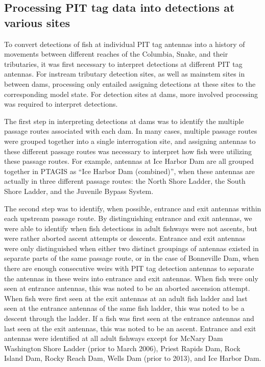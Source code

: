 \documentclass[
  12pt,
]{report}
\begin{document}
\hypertarget{processing-pit-tag-data-into-detections-at-various-sites}{%
\subsection{Processing PIT tag data into detections at various
sites}\label{processing-pit-tag-data-into-detections-at-various-sites}}

To convert detections of fish at individual PIT tag antennas into a
history of movements between different reaches of the Columbia, Snake,
and their tributaries, it was first necessary to interpret detections at
different PIT tag antennas. For instream tributary detection sites, as
well as mainstem sites in between dams, processing only entailed
assigning detections at these sites to the corresponding model state.
For detection sites at dams, more involved processing was required to
interpret detections.

The first step in interpreting detections at dams was to identify the
multiple passage routes associated with each dam. In many cases,
multiple passage routes were grouped together into a single
interrogation site, and assigning antennas to these different passage
routes was necessary to interpret how fish were utilizing these passage
routes. For example, antennas at Ice Harbor Dam are all grouped together
in PTAGIS as ``Ice Harbor Dam (combined)'', when these antennas are
actually in three different passage routes: the North Shore Ladder, the
South Shore Ladder, and the Juvenile Bypass System.

The second step was to identify, when possible, entrance and exit
antennas within each upstream passage route. By distinguishing entrance
and exit antennas, we were able to identify when fish detections in
adult fishways were not ascents, but were rather aborted ascent attempts
or descents. Entrance and exit antennas were only distinguished when
either two distinct groupings of antennas existed in separate parts of
the same passage route, or in the case of Bonneville Dam, when there are
enough consecutive weirs with PIT tag detection antennas to separate the
antennas in these weirs into entrance and exit antennas. When fish were
only seen at entrance antennas, this was noted to be an aborted
ascension attempt. When fish were first seen at the exit antennas at an
adult fish ladder and last seen at the entrance antennas of the same
fish ladder, this was noted to be a descent through the ladder. If a
fish was first seen at the entrance antennas and last seen at the exit
antennas, this was noted to be an ascent. Entrance and exit antennas
were identified at all adult fishways except for McNary Dam Washington
Shore Ladder (prior to March 2006), Priest Rapids Dam, Rock Island Dam,
Rocky Reach Dam, Wells Dam (prior to 2013), and Ice Harbor Dam.
\end{document}
